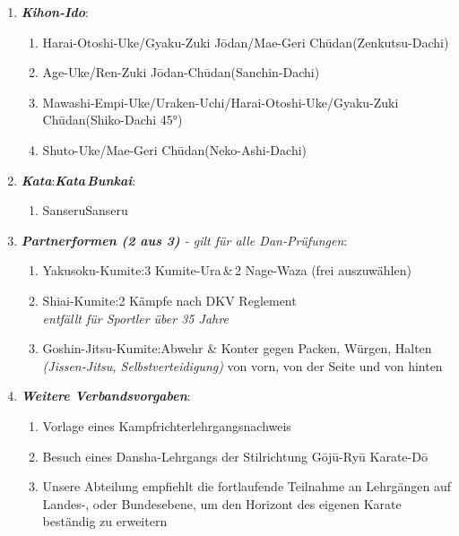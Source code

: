 	\begin{enumerate}[nosep]
		\item \textit{\textbf{Kihon-Ido}}:
		\begin{enumerate}[nosep]
			\item Harai-Otoshi-Uke/Gyaku-Zuki J\={o}dan/Mae-Geri Ch\={u}dan\tabto{335pt}(Zenkutsu-Dachi)
			\item Age-Uke/Ren-Zuki J\={o}dan-Ch\={u}dan\tabto{335pt}(Sanchin-Dachi)
			\item Mawashi-Empi-Uke/Uraken-Uchi/Harai-Otoshi-Uke/Gyaku-Zuki Ch\={u}dan\tabto{335pt}(Shiko-Dachi 45°)
			\item Shuto-Uke/Mae-Geri Ch\={u}dan\tabto{335pt}(Neko-Ashi-Dachi)
		\end{enumerate}
		\vspace{12pt}
		\item \textit{\textbf{Kata}}:\tabto{200pt}\textit{\textbf{Kata\,Bunkai}}:
		\begin{enumerate}[nosep]
			\item Sanseru\tabto{200pt}Sanseru
		\end{enumerate}
		\vspace{12pt}
		\item \textit{\textbf{Partnerformen (2 aus 3)} - gilt für alle Dan-Prüfungen}:
		\begin{enumerate}[nosep]
			\item Yakusoku-Kumite:\tabto{200pt}3 Kumite-Ura\,\&\,2 Nage-Waza (frei auszuwählen)
			\item Shiai-Kumite:\tabto{200pt}2 Kämpfe nach DKV Reglement\\\tabto{200pt}\textit{entfällt für Sportler über 35 Jahre}
			\item Goshin-Jitsu-Kumite:\tabto{200pt}Abwehr \& Konter gegen Packen, Würgen, Halten\\\textit{(Jissen-Jitsu, Selbstverteidigung)}\tabto{200pt} von vorn, von der Seite und von hinten
		\end{enumerate}
		\vspace{12pt}
		\item \textit{\textbf{Weitere Verbandsvorgaben}}:
			\begin{enumerate}[nosep]
			\item Vorlage eines Kampfrichterlehrgangsnachweis
			\item Besuch eines Dansha-Lehrgangs der Stilrichtung G\={o}j\={u}-Ry\={u} Karate-D\={o}
			\item Unsere Abteilung empfiehlt die fortlaufende Teilnahme an Lehrgängen auf Landes-, oder Bundesebene, um den Horizont des eigenen Karate beständig zu erweitern
			\end{enumerate}
	\end{enumerate}